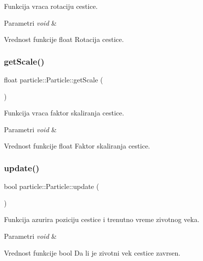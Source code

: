 Funkcija vraca rotaciju cestice. 


\begin{DoxyParams}{Parametri}
{\em void} & \\
\hline
\end{DoxyParams}
\begin{DoxyReturn}{Vrednost funkcije}
float Rotacija cestice. 
\end{DoxyReturn}
\mbox{\label{classparticle_1_1Particle_a1de9470fa01253971c9f6ed0f5849b66}} 
\subsubsection{\texorpdfstring{get\+Scale()}{getScale()}}
{\footnotesize\ttfamily float particle\+::\+Particle\+::get\+Scale (\begin{DoxyParamCaption}{ }\end{DoxyParamCaption})}



Funkcija vraca faktor skaliranja cestice. 


\begin{DoxyParams}{Parametri}
{\em void} & \\
\hline
\end{DoxyParams}
\begin{DoxyReturn}{Vrednost funkcije}
float Faktor skaliranja cestice. 
\end{DoxyReturn}
\mbox{\label{classparticle_1_1Particle_ae64c03b4dd9a95879c0fee100955a800}} 
\subsubsection{\texorpdfstring{update()}{update()}}
{\footnotesize\ttfamily bool particle\+::\+Particle\+::update (\begin{DoxyParamCaption}{ }\end{DoxyParamCaption})}



Funkcija azurira poziciju cestice i trenutno vreme zivotnog veka. 


\begin{DoxyParams}{Parametri}
{\em void} & \\
\hline
\end{DoxyParams}
\begin{DoxyReturn}{Vrednost funkcije}
bool Da li je zivotni vek cestice zavrsen. 
\end{DoxyReturn}


